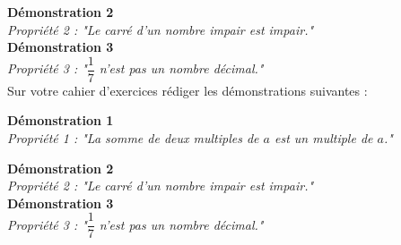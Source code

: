 \documentclass[a4paper,12pt]{article}
\begin{document}
\textbf{Démonstration 2}\\
\textit{Propriété 2 : "Le carré d'un nombre impair est impair."}\\



\textbf{Démonstration 3}\\
\textit{Propriété 3 : "$\dfrac{1}{7}$ n'est pas un nombre décimal."}\\

\vspace*{0.5cm}
\vspace*{0.5cm}
Sur votre cahier d'exercices rédiger les démonstrations suivantes :
\vspace*{0.5cm}


\textbf{Démonstration 1}\\
\textit{Propriété 1 : "La somme de deux multiples de $a$ est un multiple de $a$."}

\vspace*{0.5cm}


\textbf{Démonstration 2}\\
\textit{Propriété 2 : "Le carré d'un nombre impair est impair."}\\



\textbf{Démonstration 3}\\
\textit{Propriété 3 : "$\dfrac{1}{7}$ n'est pas un nombre décimal."}\\

\vspace*{0.5cm}
\end{document}
